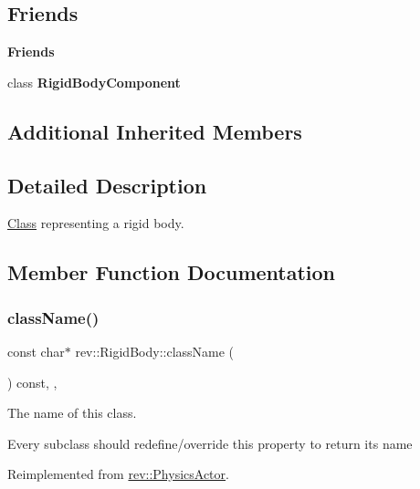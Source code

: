 \subsection*{Friends}
\begin{Indent}\textbf{ Friends}\par
\begin{DoxyCompactItemize}
\item 
\mbox{\label{classrev_1_1_rigid_body_a5e13b4068a2ee5cf4769dacc39747295}} 
class {\bfseries Rigid\+Body\+Component}
\end{DoxyCompactItemize}
\end{Indent}
\subsection*{Additional Inherited Members}


\subsection{Detailed Description}
\mbox{\hyperlink{struct_class}{Class}} representing a rigid body. 

\subsection{Member Function Documentation}
\mbox{\label{classrev_1_1_rigid_body_a996230070162f743c3e87f5c20fd981e}} 
\subsubsection{\texorpdfstring{className()}{className()}}
{\footnotesize\ttfamily const char$\ast$ rev\+::\+Rigid\+Body\+::class\+Name (\begin{DoxyParamCaption}{ }\end{DoxyParamCaption}) const\hspace{0.3cm}{\ttfamily [inline]}, {\ttfamily [override]}, {\ttfamily [virtual]}}



The name of this class. 

Every subclass should redefine/override this property to return its name 

Reimplemented from \mbox{\hyperlink{classrev_1_1_physics_actor_a5bc3e96948718546204f3201971e1914}{rev\+::\+Physics\+Actor}}.

